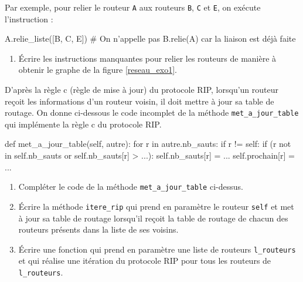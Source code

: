     Par exemple, pour relier le routeur \verb|A| aux routeurs \verb|B|, \verb|C| et \verb|E|, on exécute l’instruction :

    \begin{CodePythontexAlt}[TaillePolice=\large, Largeur=1\linewidth,Centre,Lignes=true,PremLigne=1]{}

A.relie_liste([B, C, E]) 
# On n'appelle pas B.relie(A) car la liaison est déjà faite
    \end{CodePythontexAlt}

        \begin{enumerate}[series=monDS, resume]
\item Écrire les instructions manquantes pour relier les routeurs de manière à obtenir le graphe de la figure \ref{reseau_exo1}.



\end{enumerate}

D’après la règle c (règle de mise à jour) du protocole RIP, lorsqu’un routeur reçoit les informations d’un routeur voisin, il doit mettre à jour sa table de routage. On donne ci-dessous le code incomplet de la méthode \verb|met_a_jour_table| qui implémente la règle c du protocole RIP.

    \begin{CodePythontexAlt}[TaillePolice=\large, Largeur=1\linewidth,Centre,Lignes=true,PremLigne=1]{}
def met_a_jour_table(self, autre): 
    for r in autre.nb_sauts: 
        if r != self: 
            if (r not in self.nb_sauts or self.nb_sauts[r] > ...): 
                self.nb_sauts[r] = ... 
                self.prochain[r] = ...
\end{CodePythontexAlt}

\begin{enumerate}[series=monDS, resume]
    \item Compléter le code de la méthode \verb|met_a_jour_table| ci-dessus.
    
\medskip
    \item Écrire la méthode \verb|itere_rip| qui prend en paramètre le routeur \verb|self| et met à jour sa table de routage lorsqu’il reçoit la table de routage de chacun des routeurs présents dans la liste de ses voisins.

    \medskip
    \item Écrire une fonction qui prend en paramètre une liste de routeurs \verb|l_routeurs| et qui réalise une itération du protocole RIP pour tous les routeurs de \verb|l_routeurs|.


\end{enumerate}

